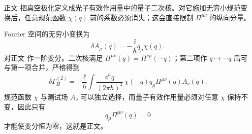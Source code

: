 \begin{derivation}

正文 把真空极化定义成光子有效作用量中的量子二次核。对它施加无穷小规范变换后，任意规范函数 \(\chi(q)\) 前的系数必须消失；这会直接限制 \(\Pi^{\mu\nu}\) 的纵向分量。

Fourier 空间的无穷小变换为
\begin{equation*}
\delta A_\mu(q)=-\frac{\ii}{\hbar}q_\mu\chi(q).
\end{equation*}
对正文 作一阶变分。二次核满足 $\Pi^{\mu\nu}(q)=\Pi^{\nu\mu}(-q)$；第二项作 $q\mapsto-q$ 后可与第一项合并，严格得到
\begin{equation*}
\delta\Gamma_{\Pi}^{(2)}
=-\frac{\ii}{\hbar}
\int\frac{\dd^4 q}{(2\pi\hbar)^4}\,
\chi(-q)q_\mu\Pi^{\mu\nu}(q)A_\nu(q).
\end{equation*}
规范函数 \(\chi\) 与测试场 \(A_\nu\) 可以独立选择，而量子有效作用量必须对任意 \(\chi\) 保持不变，因此只有
\begin{equation*}
q_\mu\Pi^{\mu\nu}(q)=0
\end{equation*}
才能使变分恒为零，这就是正文。
\end{derivation}
